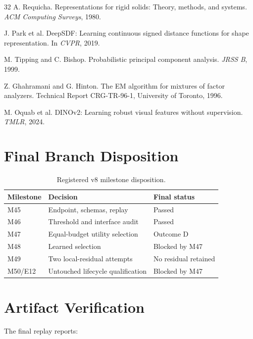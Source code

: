 \documentclass[10pt]{article}
\begin{document}
\begin{thebibliography}{32}
A. Requicha.
\newblock Representations for rigid solids: Theory, methods, and systems.
\newblock \emph{ACM Computing Surveys}, 1980.

J. Park et al.
\newblock DeepSDF: Learning continuous signed distance functions for shape
representation.
\newblock In \emph{CVPR}, 2019.

M. Tipping and C. Bishop.
\newblock Probabilistic principal component analysis.
\newblock \emph{JRSS B}, 1999.

Z. Ghahramani and G. Hinton.
\newblock The EM algorithm for mixtures of factor analyzers.
\newblock Technical Report CRG-TR-96-1, University of Toronto, 1996.

M. Oquab et al.
\newblock DINOv2: Learning robust visual features without supervision.
\newblock \emph{TMLR}, 2024.

\end{thebibliography}

\appendix

\section{Final Branch Disposition}

\begin{table}[h]
\centering
\caption{Registered v8 milestone disposition.}
\begin{tabular}{lll}
\toprule
Milestone & Decision & Final status \\
\midrule
M45 & Endpoint, schemas, replay & Passed \\
M46 & Threshold and interface audit & Passed \\
M47 & Equal-budget utility selection & Outcome D \\
M48 & Learned selection & Blocked by M47 \\
M49 & Two local-residual attempts & No residual retained \\
M50/E12 & Untouched lifecycle qualification & Blocked by M47 \\
\bottomrule
\end{tabular}
\end{table}

\section{Artifact Verification}

The final replay reports:
\end{document}
